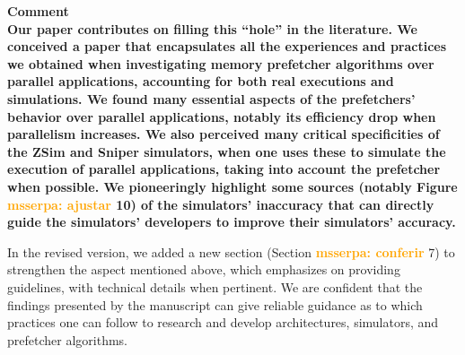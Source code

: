 \documentclass{article}
\newcounter{answer}
\newenvironment{answer}
{ \refstepcounter{answer}\vspace{0.5cm}\bfseries\noindent Comment~\theanswer\\ }
{ \vspace{0.5cm} }
\newcommand{\ms}[1]{\textcolor{orange}{\textbf{ msserpa: #1} }\vspace{0.2cm}}
\newcommand{\vsg}[1]{\textcolor{blue}{\textbf{vsgirelli: #1} }\vspace{0.2cm}}
\begin{document}
\begin{answer}
Our paper contributes on filling this ``hole'' in the literature. We conceived a paper that encapsulates all the experiences and practices we obtained when investigating memory prefetcher algorithms over parallel applications, accounting for both real executions and simulations. 
We found many essential aspects of the prefetchers' behavior over parallel applications, notably its efficiency drop when parallelism increases. We also perceived many critical specificities of the ZSim and Sniper simulators, when one uses these to simulate the execution of parallel applications, taking into account the prefetcher when possible. We pioneeringly highlight some sources (notably Figure \ms{ajustar}10) of the simulators' inaccuracy that can directly guide the simulators' developers to improve their simulators' accuracy.

In the revised version, we added a new section (Section \ms{conferir}7) to strengthen the aspect mentioned above, which emphasizes on providing guidelines, with technical details when pertinent. We are confident that the findings presented by the manuscript can give reliable guidance as to which practices one can follow to research and develop architectures, simulators, and prefetcher algorithms. 







\end{answer}
\end{document}
